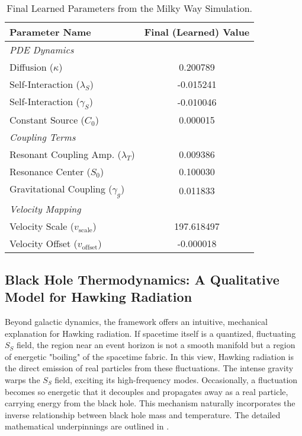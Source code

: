 \documentclass[11pt,a4paper]{article}
\newcommand{\SSp}{S_S}
\begin{document}
\begin{table}[h!]
    \centering
    \caption{Final Learned Parameters from the Milky Way Simulation.}
    \label{tab:learned_params}
    \begin{tabular}{@{}lc@{}}
        \toprule
        \textbf{Parameter Name} & \textbf{Final (Learned) Value} \\
        \midrule
        \multicolumn{2}{l}{\textit{PDE Dynamics}} \\
        Diffusion ($\kappa$) & 0.200789 \\
        Self-Interaction ($\lambda_S$) & -0.015241 \\
        Self-Interaction ($\gamma_S$) & -0.010046 \\
        Constant Source ($C_0$) & 0.000015 \\
        \midrule
        \multicolumn{2}{l}{\textit{Coupling Terms}} \\
        Resonant Coupling Amp. ($\lambda_T$) & 0.009386 \\
        Resonance Center ($S_0$) & 0.100030 \\
        Gravitational Coupling ($\gamma_g$) & 0.011833 \\
        \midrule
        \multicolumn{2}{l}{\textit{Velocity Mapping}} \\
        Velocity Scale ($v_{\text{scale}}$) & 197.618497 \\
        Velocity Offset ($v_{\text{offset}}$) & -0.000018 \\
        \bottomrule
    \end{tabular}
\end{table}

\subsection{Black Hole Thermodynamics: A Qualitative Model for Hawking Radiation}
\label{sec:hawking_radiation}
Beyond galactic dynamics, the framework offers an intuitive, mechanical explanation for Hawking radiation. If spacetime itself is a quantized, fluctuating $\SSp$ field, the region near an event horizon is not a smooth manifold but a region of energetic "boiling" of the spacetime fabric. In this view, Hawking radiation is the direct emission of real particles from these fluctuations. The intense gravity warps the $\SSp$ field, exciting its high-frequency modes. Occasionally, a fluctuation becomes so energetic that it decouples and propagates away as a real particle, carrying energy from the black hole. This mechanism naturally incorporates the inverse relationship between black hole mass and temperature. The detailed mathematical underpinnings are outlined in .
\end{document}
